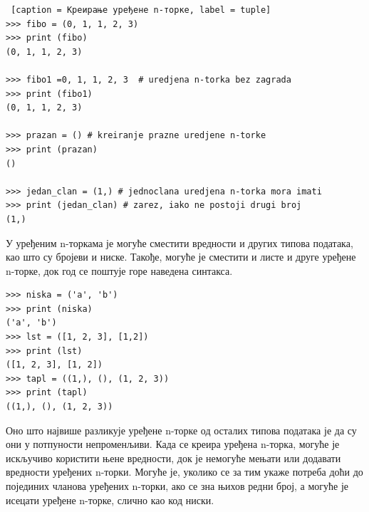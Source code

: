 \begin{lstlisting} [caption = Креирање уређене n-торке, label = tuple]
>>> fibo = (0, 1, 1, 2, 3)
>>> print (fibo)
(0, 1, 1, 2, 3)

>>> fibo1 =0, 1, 1, 2, 3  # uredjena n-torka bez zagrada
>>> print (fibo1)
(0, 1, 1, 2, 3)

>>> prazan = () # kreiranje prazne uredjene n-torke
>>> print (prazan)
()

>>> jedan_clan = (1,) # jednoclana uredjena n-torka mora imati
>>> print (jedan_clan) # zarez, iako ne postoji drugi broj
(1,)
\end{lstlisting}

У уређеним n-торкама је могуће сместити вредности и других типова података, као што су бројеви и ниске. Такође, могуће је сместити и листе и друге уређене n-торке, док год се поштује горе наведена синтакса.

\begin{lstlisting}[caption = Уређене n-торке могу садржати и ниске и  листе и друге уређене n-торке, label = str_lst_tuple]
>>> niska = ('a', 'b')
>>> print (niska)
('a', 'b')
>>> lst = ([1, 2, 3], [1,2])
>>> print (lst)
([1, 2, 3], [1, 2])
>>> tapl = ((1,), (), (1, 2, 3))
>>> print (tapl)
((1,), (), (1, 2, 3))
\end{lstlisting}

Оно што највише разликује уређене n-торке од осталих типова података је да су они у потпуности непроменљиви. Када се креира уређена n-торка, могуће је искључиво користити њене вредности, док је немогуће мењати или додавати вредности уређених n-торки. Могуће је, уколико се за тим укаже потреба доћи  до појединих чланова уређених n-торки, ако се зна њихов редни број, а могуће је исецати уређене n-торке, слично као код ниски.
